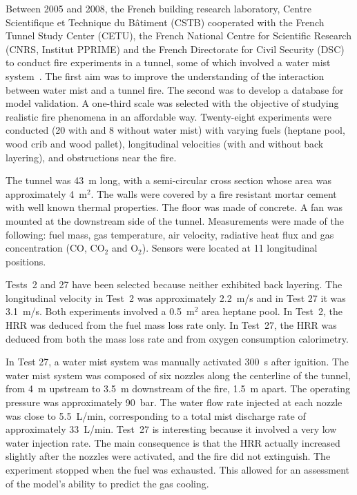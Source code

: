 Between 2005 and 2008, the French building research laboratory, Centre Scientifique et Technique du B\^{a}timent (CSTB) cooperated with
the French Tunnel Study Center (CETU), the French National Centre for Scientific Research (CNRS, Institut PPRIME) and the French Directorate for Civil Security (DSC) to conduct fire experiments in a tunnel, some of which
involved a water mist system~\cite{Meyrand}. The first aim was to improve the understanding of the interaction between water mist and a tunnel fire.
The second was to develop a database for model validation. A one-third scale was selected with the objective of studying realistic fire phenomena in an affordable way.
Twenty-eight experiments were conducted
(20 with and 8 without water mist) with varying fuels (heptane pool, wood crib and wood pallet), longitudinal velocities (with and without back layering),
and obstructions near the fire.

The tunnel was 43~m long, with a semi-circular cross section whose area was approximately 4~m$^2$. The walls were covered by a fire resistant mortar cement
with well known thermal properties. The floor was made of concrete. A fan was mounted at the downstream side of the tunnel.
Measurements were made of the following: fuel mass, gas temperature, air velocity, radiative heat flux and gas concentration (CO, CO$_2$ and O$_2$).
Sensors were located at 11 longitudinal positions.

Tests~2 and 27 have been selected because neither exhibited back layering. The longitudinal velocity in Test~2 was approximately 2.2~m/s and in Test 27 it was 3.1~m/s. Both experiments
involved a 0.5~m$^2$ area heptane pool. In Test~2, the HRR was deduced from the fuel mass loss rate only.
In Test~27, the HRR was deduced from both the mass loss rate and from oxygen consumption calorimetry.


In Test 27, a water mist system was manually activated 300~s after ignition. The water mist system was composed of six nozzles along the centerline of the tunnel,
from 4~m upstream to 3.5~m downstream of the fire, 1.5~m apart.
The operating pressure was approximately 90~bar. The water flow rate injected at each nozzle was close to 5.5~L/min, corresponding to a total mist discharge rate of approximately 33~L/min.
Test~27 is interesting because it involved a very low water injection rate.
The main consequence is that the HRR actually increased slightly after the nozzles were activated, and the fire did not extinguish.
The experiment stopped when the fuel was exhausted. This allowed for an assessment of
the model's ability to predict the gas cooling.


